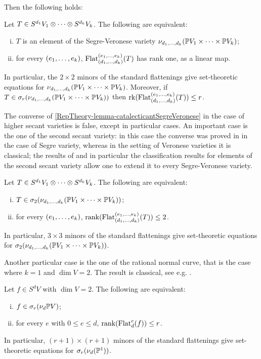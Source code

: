 Then the following holds:
\begin{lemma}
\label{RepTheory-lemma-catalecticantSegreVeronese}
 Let $T \in  S^{d_1} V_1 \otimes \cdots \otimes S^{d_k}V_k$. The following are equivalent:
 \begin{enumerate}[(i)]
  \item $T$ is an element of the Segre-Veronese variety $\nu_{d_1 , \ldots , d_k} ( \mathbb{P} V_1 \times \cdots \times \mathbb{P} V_k)$;
  \item for every $(e_1 , \ldots , e_k)$, $\mathrm{Flat}_{(d_1 , \ldots , d_k)}^{(e_1 , \ldots , e_k)}(T)$ has rank one, as a linear map. 
 \end{enumerate}
In particular, the $2 \times 2$ minors of the standard flattenings give set-theoretic equations for $\nu_{d_1 , \ldots , d_k} ( \mathbb{P} V_1 \times \cdots \times \mathbb{P} V_k)$. Moreover, if $T \in \sigma_r(\nu_{d_1 , \ldots , d_k} ( \mathbb{P} V_1 \times \cdots \times \mathbb{P} V_k))$ then $\operatorname{rk}(\mathrm{Flat}_{(d_1 , \ldots , d_k)}^{(e_1 , \ldots , e_k)}(T)) \leq r$.
\end{lemma}
The converse of \ref{RepTheory-lemma-catalecticantSegreVeronese} in the case of higher secant varieties is false, except in particular cases. An important case is the one of the second secant variety: in this case the converse was proved in \cite[Theorem 5.1]{LM04} in the case of Segre variety, whereas in the setting of Veronese varieties it is classical; the results of \cite{BL14} and in particular the classification results for elements of the second secant variety allow one to extend it to every Segre-Veronese variety.
\begin{theorem}
 \label{RepTheory-theorem-LandsbergManivelSigma2}
 Let $T \in  S^{d_1} V_1 \otimes \cdots \otimes S^{d_k}V_k$. The following are equivalent:
 \begin{enumerate}[(i)]
  \item $T \in \sigma_2(\nu_{d_1 , \ldots , d_k} ( \mathbb{P} V_1 \times \cdots \times \mathbb{P} V_k))$;
  \item for every $(e_1 , \ldots , e_k)$, $\mathrm{rank}( \mathrm{Flat}_{(d_1 , \ldots , d_k)}^{(e_1 , \ldots , e_k)}(T) ) \leq 2$. 
 \end{enumerate} 
 In particular, $3 \times 3$ minors of the standard flattenings give set-theoretic equations for $ \sigma_2(\nu_{d_1 , \ldots , d_k} ( \mathbb{P} V_1 \times \cdots \times \mathbb{P} V_k))$.
\end{theorem}
Another particular case is the one of the rational normal curve, that is the case where $k = 1$ and $\dim V = 2$. The result is classical, see e.g. \cite[Chapter 7]{IK99}.
\begin{theorem}
 \label{RepTheory-theorem-rationalnormalcurves}
 Let $f \in  S^{d} V$ with $\dim V = 2$. The following are equivalent:
 \begin{enumerate}[(i)]
  \item $f \in \sigma_r(\nu_{d} \mathbb{P} V)$;
  \item for every $e$ with $0 \leq e \leq d$, $\mathrm{rank}( \mathrm{Flat}_d^e(f))  \leq r$. 
 \end{enumerate} 
 In particular, $(r+1) \times (r+1)$ minors of the standard flattenings give set-theoretic equations for $\sigma_r(\nu_d(\mathbb{P}^1))$.
\end{theorem}
